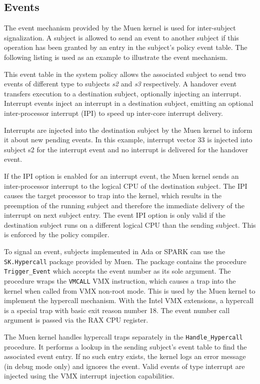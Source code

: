 \subsection{Events}\label{subsec:events}
The event mechanism provided by the Muen kernel is used for
inter-subject signalization. A subject is allowed to send an event to another
subject if this operation has been granted by an entry in the subject's policy
event table. The following listing is used as an example to illustrate the
event mechanism.



This event table in the system policy allows the associated subject to send two
events of different type to subjects \emph{s2} and \emph{s3} respectively. A
handover event transfers execution to a destination subject, optionally
injecting an interrupt.  Interrupt events inject an interrupt in a destination
subject, emitting an optional inter-processor interrupt (IPI) to
speed up inter-core interrupt delivery.

Interrupts are injected into the destination subject by the Muen kernel to
inform it about new pending events. In this example, interrupt vector 33 is
injected into subject s2 for the interrupt event and no interrupt is delivered
for the handover event.

If the IPI option is enabled for an interrupt event, the Muen kernel sends an
inter-processor interrupt to the logical CPU of the destination subject. The
IPI causes the target processor to trap into the kernel, which results in the
preemption of the running subject and therefore the immediate delivery of the
interrupt on next subject entry. The event IPI option is only valid if the
destination subject runs on a different logical CPU than the sending subject.
This is enforced by the policy compiler.

To signal an event, subjects implemented in Ada or SPARK can use the
\texttt{SK.Hypercall} package provided by Muen. The package contains the
procedure \texttt{Trigger\_Event} which accepts the event number as its sole
argument. The procedure wraps the \texttt{VMCALL} VMX instruction, which causes
a trap into the kernel when called from VMX non-root mode. This is used by the
Muen kernel to implement the hypercall mechanism.  With the Intel VMX
extensions, a hypercall is a special trap with basic exit reason number 18. The
event number call argument is passed via the RAX CPU register.

The Muen kernel handles hypercall traps separately in the
\texttt{Handle\_Hypercall} procedure. It performs a lookup in the sending
subject's event table to find the associated event entry. If no such entry
exists, the kernel logs an error message (in debug mode only) and ignores the
event. Valid events of type interrupt are injected using the VMX interrupt
injection capabilities.

